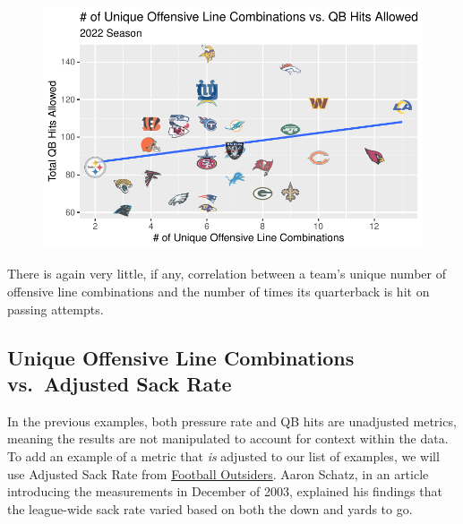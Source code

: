 \documentclass[
  letterpaper,
]{krantz}
\begin{document}
\begin{figure}[H]

{\centering \includegraphics{01-nfl-analytics-and-r_files/figure-pdf/plot-combos-qb-hits-1.pdf}

}

\end{figure}

There is again very little, if any, correlation between a team's unique
number of offensive line combinations and the number of times its
quarterback is hit on passing attempts.

\hypertarget{unique-offensive-line-combinations-vs.-adjusted-sack-rate}{%
\subsection{Unique Offensive Line Combinations vs.~Adjusted Sack
Rate}\label{unique-offensive-line-combinations-vs.-adjusted-sack-rate}}

In the previous examples, both pressure rate and QB hits are unadjusted
metrics, meaning the results are not manipulated to account for context
within the data. To add an example of a metric that \emph{is} adjusted
to our list of examples, we will use Adjusted Sack Rate from
\href{https://www.footballoutsiders.com/}{Football Outsiders}. Aaron
Schatz, in an article introducing the measurements in December of 2003,
explained his findings that the league-wide sack rate varied based on
both the down and yards to go.
\end{document}
